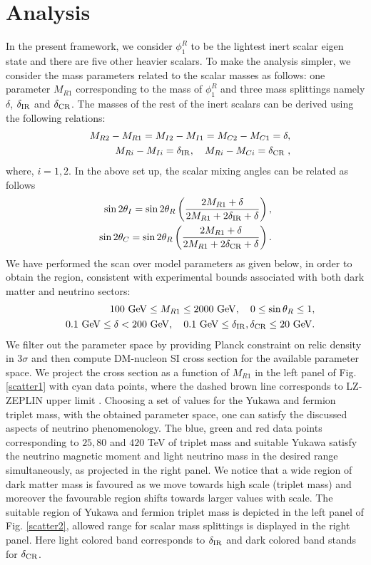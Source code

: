 \documentclass[aps, a4paper,superscriptaddress,12pt,preprintnumbers,floatfix,nofootinbib,amsmath,amssymb]{revtex4}
\newcommand{\nn}{\nonumber}
\begin{document}
\section{Analysis}
In the present framework, we consider $\phi^R_1$ to be the lightest inert scalar eigen state and there are five other heavier scalars. To make the analysis simpler, we consider the mass parameters related to the scalar masses as follows:  one parameter $M_{R1}$ corresponding to the mass of $\phi^R_1$ and three mass splittings namely $\delta$, $\delta_{\rm IR}$ and $\delta_{\rm CR}$. The masses of the rest of the inert scalars can be derived using the following relations:
\begin{eqnarray}
&& M_{R2} - M_{R1} = M_{I2} - M_{I1} = M_{C2} - M_{C1} = \delta, \nn\\
&& M_{Ri} - M_{Ii} = \delta_{\rm IR}, \quad M_{Ri} - M_{Ci} = \delta_{\rm CR}\;,
\end{eqnarray}
where, $i = 1,2$. In the above set up, the scalar mixing angles can be related as follows
\begin{eqnarray}
    \sin2\theta_I = \sin2\theta_R \left(\frac{2 M_{R1} + \delta}{2 M_{R1}+2\delta_{\rm IR} +\delta}\right),\\
    \sin2\theta_C = \sin2\theta_R \left(\frac{2 M_{R1} + \delta}{2 M_{R1}+2\delta_{\rm CR} +\delta}\right).
\end{eqnarray}
We have performed the scan over model parameters as given below, in order to obtain the region, consistent with experimental bounds associated with both dark matter and neutrino sectors: 
\begin{eqnarray}
&&100 ~{\rm GeV} \le M_{R1} \le 2000 ~{\rm GeV}, \quad 0 \le \sin\theta_R \le 1, \nn\\
&&0.1 ~{\rm GeV} \le \delta < 200 ~{\rm GeV}, \quad 0.1 ~{\rm GeV} \le \delta_{\rm IR}, \delta_{\rm CR} \le 20 ~{\rm GeV}.
\end{eqnarray}
We filter out the parameter space by providing Planck constraint on relic density \cite{Aghanim:2018eyx} in $3\sigma$ and then compute DM-nucleon SI cross section for the available parameter space. We project the cross section as a function of $M_{R1}$ in the left panel of Fig. \ref{scatter1} with cyan data points,  where the dashed brown line corresponds to LZ-ZEPLIN upper limit \cite{LZ:2022ufs}. Choosing a set of values for the Yukawa and fermion triplet mass, with the obtained parameter space, one can satisfy the discussed aspects of neutrino phenomenology. The blue, green and red data points corresponding to $25, 80$ and $420$ TeV of triplet mass and suitable Yukawa satisfy the neutrino magnetic moment and light neutrino mass in the desired range simultaneously, as projected in the right panel. We notice that a wide region of dark matter mass is favoured as we move towards high scale (triplet mass) and moreover the favourable region shifts towards larger values with scale. The suitable region of Yukawa and fermion triplet mass is depicted in the left panel of Fig. \ref{scatter2}, allowed range for scalar mass splittings is displayed in the right panel. Here light colored band corresponds to $\delta_{\rm IR}$ and dark colored band stands for $\delta_{\rm CR}$.
\end{document}
